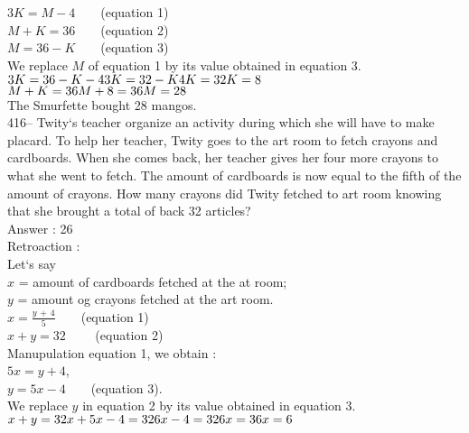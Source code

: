 ﻿\documentclass[letterpaper, 12pt]{article}
\begin{document}
$3K=M-4 \qquad $(equation 1)\\
$M+K=36 \qquad $(equation 2)\\

$M=36-K\qquad $(equation 3)\\

We replace $M$ of equation 1 by its value obtained in equation
3.\\
$3K=36-K-4\\
3K=32-K\\
4K=32\\
K=8$\\

$M+K=36\\
M+8=36\\
M=28$\\
The Smurfette bought 28 mangos.\\

416-- Twity`s teacher organize an activity during which she will have to make placard. To help her teacher, Twity goes to the art room to fetch crayons and cardboards. When she comes back, her teacher gives her four more crayons to what she went to fetch. The amount of cardboards is now equal to the fifth of the amount of crayons. How many crayons did Twity fetched to art room knowing that she brought a total of back 32 articles?\\

Answer : 26\\

Retroaction : \\
Let`s say\\
$x$ = amount of cardboards fetched at the at room;\\
$y$ = amount og crayons fetched at the art room.\\

$x=\frac{y\,+\,4}{5}  \qquad $(equation 1)\\
$x+y=32 \qquad $ (equation 2)\\

Manupulation equation 1, we obtain : \\
$5x=y+4$,\\
$y=5x-4  \qquad $(equation 3).\\

We replace $y$ in equation 2 by its value obtained in equation
3.\\
$x+y=32\\
x+5x-4=32\\
6x-4=32\\
6x=36\\
x=6$\\
\end{document}
